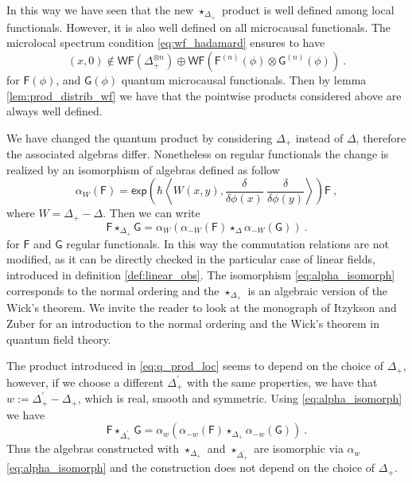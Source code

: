 \documentclass[11pt]{book}
\newcommand{\WF}{\mathsf{WF}}
\renewcommand{\exp}{\mathsf{exp}}
\newcommand{\sm}[1]{\left\langle#1\right\rangle}
\newcommand{\Fsf}{\mathsf{F}}
\newcommand{\Gsf}{\mathsf{G}}
\theoremstyle{break}
\begin{document}
In this way we have seen that the new $\star_{\Delta_+}$ product is well defined among local functionals. However, it is also well defined on all microcausal functionals. The microlocal spectrum condition \eqref{eq:wf_hadamard} ensures to have
%
\begin{equation*}
(x,0) \notin \WF(\Delta_+^{\otimes n}) \oplus \WF\left(\Fsf^{(n)}(\phi) \otimes \Gsf^{(n)}(\phi)\right) \ .
\end{equation*}
%
for $\Fsf(\phi)$, and $\Gsf(\phi)$ quantum microcausal functionals. Then by lemma \ref{lem:prod_distrib_wf} we have that the pointwise products considered above are always well defined.


\bigskip


We have changed the quantum product by considering $\Delta_+$ instead of $\Delta$, therefore the associated algebras differ. Nonetheless on regular functionals the change is realized by an isomorphism of algebras defined as follow
%
\begin{equation}
\alpha_{W}(\Fsf) = \exp\left(\hbar \sm{ W(x,y) , \frac{\delta}{\delta\phi(x)} \ \frac{\delta}{\delta\phi(y)} } \right) \Fsf \ ,
\label{eq:alpha_isomorph} 
\end{equation}
%
where $W = \Delta_+ - \Delta$. Then we can write
%
\begin{equation*}
\Fsf \star_{\Delta_+} \Gsf = \alpha_W \left(\alpha_{-W}(\Fsf) \star_{\Delta} \alpha_{-W}(\Gsf)\right) \ .
\end{equation*}
%
for $\Fsf$ and $\Gsf$ regular functionals. In this way the commutation relations are not modified, as it can be directly checked in the particular case of linear fields, introduced in definition \ref{def:linear_obs}. The isomorphism \eqref{eq:alpha_isomorph} corresponds to the normal ordering and the $\star_{\Delta_+}$ is an algebraic version of the Wick's theorem. We invite the reader to look at the monograph of Itzykson and Zuber \cite{IZ_1980} for an introduction to the normal ordering and the Wick's theorem in quantum field theory. 


\bigskip


The product introduced in \eqref{eq:q_prod_loc} seems to depend on the choice of $\Delta_+$, however, if we choose a different $\Delta^\prime_+$ with the same properties, we have that $w:=\Delta^\prime_+ - \Delta_+$, which is real, smooth and symmetric. Using \eqref{eq:alpha_isomorph} we have
%
\begin{equation}
\Fsf \star_{\Delta^\prime_+} \Gsf = \alpha_w \left(\alpha_{-w}(\Fsf) \star_{\Delta_+} \alpha_{-w}(\Gsf)\right) \ .
\end{equation}
%
Thus the algebras constructed with $\star_{\Delta_+}$ and $\star_{\Delta^\prime_+}$ are isomorphic via $\alpha_{w}$ \eqref{eq:alpha_isomorph} and the construction does not depend on the choice of $\Delta_+$.
\end{document}
